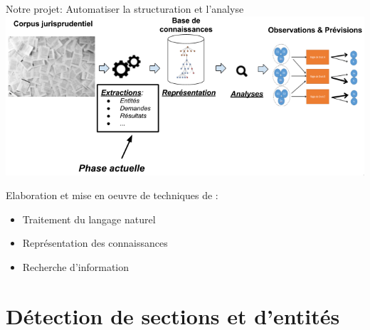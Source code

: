 \documentclass[newPxFont,pagenumber]{beamer}
\begin{document}
\begin{frame}{Notre projet: Automatiser la structuration et l'analyse}
\includegraphics[width=\textwidth]{pipeline-cassandra2.png}

Elaboration et mise en oeuvre de techniques de :
\begin{itemize}
\item Traitement du langage naturel 

\item Représentation des connaissances
 
\item Recherche d'information
\end{itemize}

\end{frame}


\section{Détection de sections et d'entités}
\end{document}
